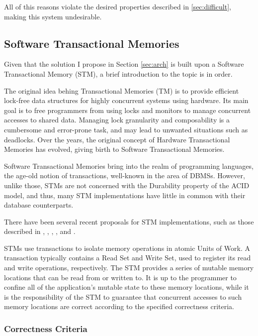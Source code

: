 \documentclass{llncs}
\begin{document}
All of this reasons violate the desired properties described in
\ref{sec:difficult}, making this system undesirable.

\subsection{Software Transactional Memories}
\label{sec:stm}

Given that the solution I propose in Section \ref{sec:arch} is built
upon a Software Transactional Memory (STM), a brief introduction to
the topic is in order.

The original idea behing Transactional Memories (TM) is to provide
efficient lock-free data structures for highly concurrent systems
\cite{herlihy1993transactional} using hardware. Its main goal is to
free programmers from using locks and monitors to manage concurrent
accesses to shared data. Managing lock granularity and composability
is a cumbersome and error-prone task, and may lead to unwanted
situations such as deadlocks. Over the years, the original concept of
Hardware Transactional Memories has evolved, giving birth to Software
Transactional Memories.

Software Transactional Memories bring into the realm of programming
languages, the age-old notion of transactions, well-known in the area
of DBMSs. However, unlike those, STMs are not concerned with the
Durability property of the ACID model, and thus, many STM
implementations have little in common with their database
counterparts.

There have been several recent proposals for STM implementations, such
as those described in \cite{cachopo2006versioned},
\cite{herlihy2003software}, \cite{marathe2005adaptive},
\cite{dice2006transactional}, \cite{riegel2006lazy} and
\cite{marathe2006lowering}.

STMs use transactions to isolate memory operations in atomic Units of
Work. A transaction typically contains a Read Set and Write Set, used
to register its read and write operations, respectively. The STM
provides a series of mutable memory locations that can be read from or
written to. It is up to the programmer to confine all of the
application's mutable state to these memory locations, while it is the
responsibility of the STM to guarantee that concurrent accesses to
such memory locations are correct according to the specified
correctness criteria.

\subsubsection{Correctness Criteria}
\end{document}
